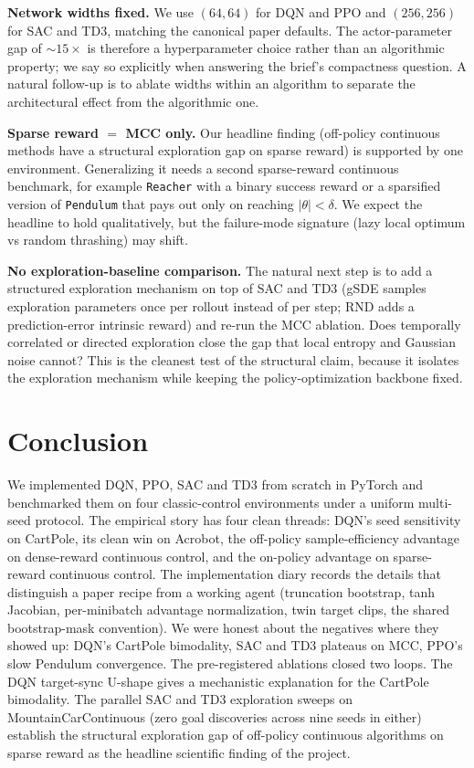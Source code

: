 \documentclass[10pt,a4paper]{article}
\begin{document}
\textbf{Network widths fixed.} We use $(64, 64)$ for DQN and PPO and $(256, 256)$ for SAC and TD3, matching the canonical paper defaults. The actor-parameter gap of $\sim 15\times$ is therefore a hyperparameter choice rather than an algorithmic property; we say so explicitly when answering the brief's compactness question. A natural follow-up is to ablate widths within an algorithm to separate the architectural effect from the algorithmic one.

\textbf{Sparse reward $=$ MCC only.} Our headline finding (off-policy continuous methods have a structural exploration gap on sparse reward) is supported by one environment. Generalizing it needs a second sparse-reward continuous benchmark, for example \texttt{Reacher} with a binary success reward or a sparsified version of \texttt{Pendulum} that pays out only on reaching $|\theta| < \delta$. We expect the headline to hold qualitatively, but the failure-mode signature (lazy local optimum vs random thrashing) may shift.

\textbf{No exploration-baseline comparison.} The natural next step is to add a structured exploration mechanism on top of SAC and TD3 (gSDE \cite{raffin2022smooth} samples exploration parameters once per rollout instead of per step; RND adds a prediction-error intrinsic reward) and re-run the MCC ablation. Does temporally correlated or directed exploration close the gap that local entropy and Gaussian noise cannot? This is the cleanest test of the structural claim, because it isolates the exploration mechanism while keeping the policy-optimization backbone fixed.

\section{Conclusion}

We implemented DQN, PPO, SAC and TD3 from scratch in PyTorch and benchmarked them on four classic-control environments under a uniform multi-seed protocol. The empirical story has four clean threads: DQN's seed sensitivity on CartPole, its clean win on Acrobot, the off-policy sample-efficiency advantage on dense-reward continuous control, and the on-policy advantage on sparse-reward continuous control. The implementation diary records the details that distinguish a paper recipe from a working agent (truncation bootstrap, tanh Jacobian, per-minibatch advantage normalization, twin target clips, the shared bootstrap-mask convention). We were honest about the negatives where they showed up: DQN's CartPole bimodality, SAC and TD3 plateaus on MCC, PPO's slow Pendulum convergence. The pre-registered ablations closed two loops. The DQN target-sync U-shape gives a mechanistic explanation for the CartPole bimodality. The parallel SAC and TD3 exploration sweeps on MountainCarContinuous (zero goal discoveries across nine seeds in either) establish the structural exploration gap of off-policy continuous algorithms on sparse reward as the headline scientific finding of the project.




\end{document}
